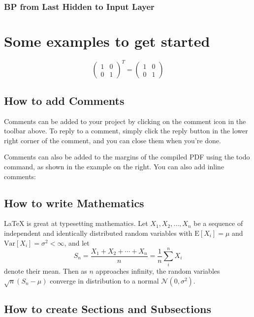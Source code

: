 \documentclass[a4paper]{article}
\begin{document}
\subsubsection{BP from Last Hidden to Input Layer}

\section{Some examples to get started}

\[ \left( \begin{array}{cc}
1 & 0 \\
0 & 1
\end{array} \right)^{T}
%
=
\left( \begin{array}{cc}
1 & 0 \\
0 & 1
\end{array} \right)
\]

\subsection{How to add Comments}

Comments can be added to your project by clicking on the comment icon in the toolbar above. %
%
%
To reply to a comment, simply click the reply button in the lower right corner of the comment, and you can close them when you're done.

Comments can also be added to the margins of the compiled PDF using the todo command, as shown in the example on the right. You can also add inline comments:


\subsection{How to write Mathematics}

\LaTeX{} is great at typesetting mathematics. Let $X_1, X_2, \ldots, X_n$ be a sequence of independent and identically distributed random variables with $\text{E}[X_i] = \mu$ and $\text{Var}[X_i] = \sigma^2 < \infty$, and let
\[S_n = \frac{X_1 + X_2 + \cdots + X_n}{n}
      = \frac{1}{n}\sum_{i}^{n} X_i\]
denote their mean. Then as $n$ approaches infinity, the random variables $\sqrt{n}(S_n - \mu)$ converge in distribution to a normal $\mathcal{N}(0, \sigma^2)$.


\subsection{How to create Sections and Subsections}
\end{document}

